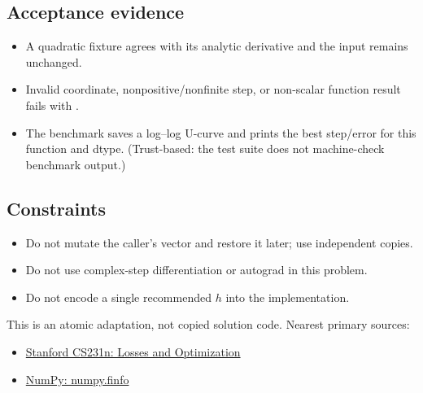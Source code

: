         \subsection{Acceptance evidence}

        \begin{evidencebox}
        \begin{itemize}
          \item A quadratic fixture agrees with its analytic derivative and the input remains unchanged.
  \item Invalid coordinate, nonpositive/nonfinite step, or non-scalar function result fails with .
  \item The benchmark saves a log--log U-curve and prints the best step/error for this function and dtype. (Trust-based: the test suite does not machine-check benchmark output.)
        \end{itemize}
        \end{evidencebox}

        \subsection{Constraints}

        \begin{itemize}
          \item Do not mutate the caller's vector and restore it later; use independent copies.
  \item Do not use complex-step differentiation or autograd in this problem.
  \item Do not encode a single recommended $h$ into the implementation.
        \end{itemize}

        \begin{sourcebox}
        This is an atomic adaptation, not copied solution code. Nearest primary sources:
        \begin{itemize}
          \item \href{https://cs231n.github.io/optimization-1/}{Stanford CS231n: Losses and Optimization}
  \item \href{https://numpy.org/doc/stable/reference/generated/numpy.finfo.html}{NumPy: numpy.finfo}
        \end{itemize}
        \end{sourcebox}
